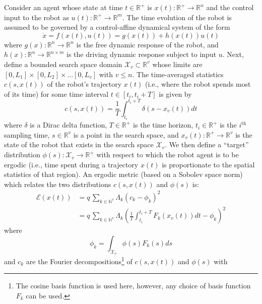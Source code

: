 \documentclass[conference]{IEEEtran}
\begin{document}
Consider an agent whose state at time $t\in \mathbb{R}^+$ is $x(t) : \mathbb{R}^+ \to  \mathbb{R}^n$ and the control input to the robot as $u(t) : \mathbb{R}^+ \to \mathbb{R}^m$.
The time evolution of the robot is assumed to be governed by a control-affine dynamical system of the form
\begin{equation} \label{eq:robot_dynamics}
\dot{x} = f(x(t),u(t)) = g(x(t)) + h(x(t)) u(t)
\end{equation}
where $g(x) : \mathbb{R}^n \to \mathbb{R}^n$ is the free dynamic response of the robot, and $h(x): \mathbb{R}^n \to \mathbb{R}^{n \times m}$ is the driving dynamic response subject to input $u$.
Next, define a bounded search space domain $\mathcal{X}_v \subset \mathbb{R}^v$  whose limits are $\left[0,L_1 \right] \times \left[ 0,L_2 \right] \times \ldots \left[ 0, L_v\right]$ with $v\le n$. 
The time-averaged statistics $c(s, x(t))$ of the robot's trajectory $x(t)$ (i.e., where the robot spends most of its time) for some time interval $t \in \left[ t_i, t_i + T\right]$ is given by
\begin{equation}
c(s, x(t)) = \frac{1}{T}\int_{t_i}^{t_i+T} \delta (s - x_v(t)) dt
\end{equation}
where $\delta$ is a Dirac delta function, $T \in \mathbb{R}^+$ is the time horizon, $t_i \in \mathbb{R}^+$ is the $i^\text{th}$ sampling time, $s \in \mathbb{R}^v$ is a point in the search space, and $x_v(t) : \mathbb{R}^+ \to \mathbb{R}^v$ is the state of the robot that exists in the search space $\mathcal{X}_v$.
We then define a ``target'' distribution $\phi(s) : \mathcal{X}_v \to \mathbb{R}^+$ with respect to which the robot agent is to be ergodic (i.e., time spent during a trajectory $x(t)$ is proportionate to the spatial statistics of that region).
An ergodic metric (based on a Sobolev space norm)~\cite{mathew2011metrics} which relates the two distributions $c(s,x(t))$ and $\phi(s)$ is:
\begin{align} \label{eq:ergodic_metric}
\mathcal{E}(x(t)) & = q \,\sum_{k \in \mathbb{N}^v} \Lambda_k \left(c_k -\phi_k \right)^2   \\
& = q \, \sum_{k \in \mathbb{N}^v} \Lambda_k \left( \frac{1}{T} \int_{t_i}^{t_i + T} F_k(x_v(t)) dt - \phi_k \right)^2 \nonumber
\end{align}
where 
\begin{equation}\label{eq:get_phik}
\phi_k = \int_{\mathcal{X}_v} \phi(s) F_k(s) ds
\end{equation}
and $c_k$ are the Fourier decompositions\footnote{The cosine basis function is used here, however, any choice of basis function $F_k$ can be used.} of $c(s,x(t))$ and $\phi(s)$ with
\end{document}
